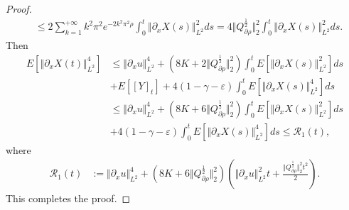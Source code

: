 \documentclass[11pt]{article}
\numberwithin{equation}{section}%
\numberwithin{figure}{section}%
\theoremstyle{remark}
\begin{document}
\begin{proof}
\begin{align*}
			&\leq 2\sum_{k=1}^{+\infty}k^{2}\pi^{2}e^{-2k^{2}\pi^{2}\rho}\int_{0}^{t}\Vert \partial_{x} X(s) \Vert_{L^{2}}^{2}ds=4\Vert Q_{\partial\rho}^{\frac{1}{2}}\Vert^{2}_{2}\int_{0}^{t}\Vert \partial_{x} X(s) \Vert_{L^{2}}^{2}ds.
		\end{align*}
		Then
		\begin{align*}
			E[\Vert \partial_{x} X(t)\Vert _{L^{2}}^{4}]
			&\leq\Vert\partial_{x} u\Vert _{L^{2}}^{4}+\left(8K+2\Vert Q_{\partial\rho}^{\frac{1}{2}}\Vert^{2}_{2}\right)\int_{0}^{t}E[\Vert \partial_{x} X(s)\Vert _{L^{2}}^{2}]ds\\
			&+E[[Y]_{t}]+4\left(1-\gamma -\varepsilon\right)\int_{0}^{t}E[\Vert\partial_{x} X(s)\Vert _{L^{2}}^{4}]ds\\
			&\leq\Vert\partial_{x} u\Vert _{L^{2}}^{4}+\left(8K+6\Vert Q_{\partial\rho}^{\frac{1}{2}}\Vert^{2}_{2}\right)\int_{0}^{t}E[\Vert \partial_{x} X(s)\Vert _{L^{2}}^{2}]ds\\
			&+4\left(1-\gamma -\varepsilon\right)\int_{0}^{t}E[\Vert\partial_{x} X(s)\Vert _{L^{2}}^{4}]ds\leq \mathcal{R}_{1}(t),
		\end{align*}
		where
		\begin{align*}
			\mathcal{R}_{1}(t)&:=\Vert\partial_{x} u\Vert _{L^{2}}^{4}+\left(8K+6\Vert Q_{\partial\rho}^{\frac{1}{2}}\Vert^{2}_{2}\right)\left(\Vert\partial_{x} u\Vert _{L^{2}}^{2}t+\frac{\Vert Q_{\partial\rho}^{\frac{1}{2}}\Vert^{2}_{2}t^{2}}{2}\right).
		\end{align*}
	This completes the proof.
	\end{proof}
\end{document}
